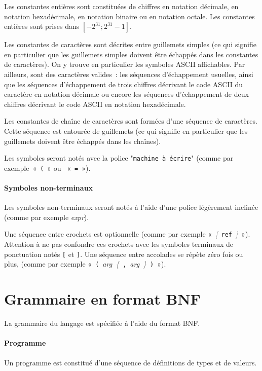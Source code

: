 \documentclass[a4paper,8pt]{article}
\newcommand{\kwd}[1]{\texttt{#1}}
\newcommand{\rul}[1]{\textsl{#1}}
\newcommand{\car}[1]{\texttt{#1}}
\newcommand{\meta}[1]{\textcolor{gray}{#1}}
\newcommand{\repeatseq}[1]{\textsl{\meta{\{}} #1 \textsl{\meta{\}}}}
\newcommand{\optw}[1]{\textsl{\meta{[}} #1 \textsl{\meta{]}}}
\begin{document}
Les constantes entières sont constituées de chiffres en notation
décimale, en notation hexadécimale, en notation binaire ou en notation
octale. Les constantes entières sont prises dans
$[-2^{31}; 2^{31} - 1]$.

Les constantes de caractères sont décrites entre guillemets simples
(ce qui signifie en particulier que les guillemets simples doivent
être échappés dans les constantes de caractères). On y trouve en
particulier les symboles ASCII affichables. Par ailleurs, sont des
caractères valides~: les séquences d'échappement usuelles, ainsi que
les séquences d'échappement de trois chiffres décrivant le code ASCII
du caractère en notation décimale ou encore les séquences
d'échappement de deux chiffres décrivant le code ASCII en notation
hexadécimale.

Les constantes de chaîne de caractères sont formées d'une séquence de
caractères. Cette séquence est entourée de guillemets (ce qui signifie
en particulier que les guillemets doivent être échappés dans les
chaînes).

Les symboles seront notés avec la police "\car{machine à écrire}"
(comme par exemple~«~\car{(}~» ou ~«~\car{=}~»).

\paragraph{Symboles non-terminaux}
Les symboles non-terminaux seront notés à l'aide d'une police
légèrement inclinée (comme par exemple \rul{expr}).

Une séquence entre crochets est optionnelle (comme par exemple
«~\optw{\kwd{ref}}~»). Attention à ne pas confondre ces crochets
avec les symboles terminaux de ponctuation notés \car{[} et
  \car{]}. Une séquence entre accolades se répète zéro fois ou plus,
(comme par exemple
«~\car{(}~\rul{arg}~\repeatseq{\car{,}~\rul{arg}}~\car{)}~»).

\section{Grammaire en format BNF}

La grammaire du langage est spécifiée à l'aide du format BNF.

\paragraph{Programme} Un programme est constitué d'une séquence
de définitions de types et de valeurs.
\end{document}
